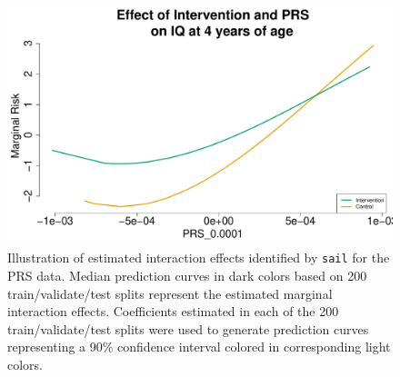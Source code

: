 \documentclass[12pt,letter]{article}\usepackage[]{graphicx}\usepackage[]{color}
\newenvironment{knitrout}{}{} %
\begin{document}
\begin{knitrout}\scriptsize
{}\color{fgcolor}\begin{figure}[H]

{\centering \includegraphics[width=1\linewidth]{figure/PRS-intervention-interaction-1} 

}

\caption[Illustration of estimated interaction effects identified by \texttt{sail} for the PRS data]{Illustration of estimated interaction effects identified by \texttt{sail} for the PRS data. Median prediction curves in dark colors based on 200 train/validate/test splits represent the estimated marginal interaction effects. Coefficients estimated in each of the 200 train/validate/test splits were used to generate prediction curves representing a 90\% confidence interval colored in corresponding light colors.}\label{fig:PRS-intervention-interaction}
\end{figure}


\end{knitrout}
\end{document}
